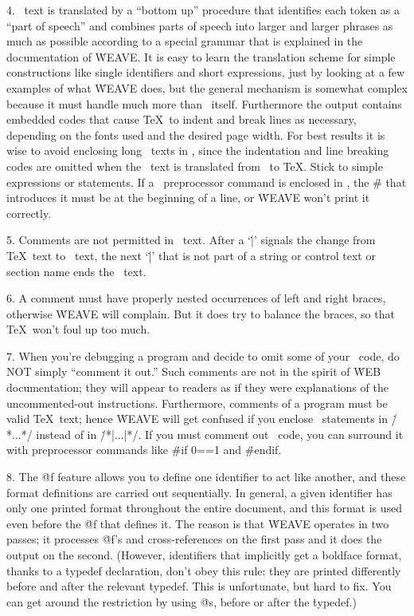 4. \Cee\ text is translated by a ``bottom up'' procedure that
identifies each token as a ``part of speech'' and combines parts of speech
into larger and larger phrases as much as possible according to a special
grammar that is explained in the documentation of \.{WEAVE}. It is easy to
learn the translation scheme for simple constructions like single
identifiers and short expressions, just by looking at a few examples of
what \.{WEAVE} does, but the general mechanism is somewhat complex because
it must handle much more than \Cee\ itself. Furthermore the output
contains embedded codes that cause \TeX\ to indent and break lines as
necessary, depending on the fonts used and the desired page width. For
best results it is wise to avoid enclosing long \Cee\ texts in \pb, since the
indentation and line breaking codes are omitted when the \pb\ text is
translated from \Cee\ to \TeX. Stick to simple expressions or
statements.  If a \Cee\ preprocessor command is enclosed in \pb,
the \.\# that introduces it must be at the beginning of a line,
or \.{WEAVE} won't print it correctly.

5. Comments are not permitted in \pb\ text. After a `\.|'
signals the change from \TeX\ text to \Cee\ text, the next `\.|' that is
not part of a string or control text or section name ends the \Cee\ text.

6. A comment must have properly nested occurrences of left and right
braces, otherwise \.{WEAVE} will complain. But it
does try to balance the braces, so that \TeX\ won't foul up too much.

7. When you're debugging a program and decide to omit some of your
\Cee\ code, do NOT simply ``comment it out.'' Such comments are not
in the spirit of \.{WEB} documentation; they will appear to readers
as if they were explanations of the uncommented-out instructions.
Furthermore, comments of a program must be valid \TeX\ text; hence
\.{WEAVE} will get confused if you enclose \Cee\ statements in
\.{/*...*/} instead of in \.{/*|...|*/}.  If you must comment out
\Cee\ code, you can surround it with preprocessor commands
like \.{\#if 0==1} and \.{\#endif}.

8. The \.{@f} feature allows you to define one identifier to act like
another, and these format definitions are carried out sequentially.
In general, a given identifier has only one printed format
throughout the entire document, and this format is used even before
the \.{@f} that defines it. The reason is that \.{WEAVE} operates in two
passes; it processes \.{@f}'s and cross-references on the first pass and
it does the output on the second.  (However, identifiers that
implicitly get a boldface format, thanks to a \.{typedef} declaration,
don't obey this rule: they are printed differently before and after
the relevant \.{typedef}.  This is unfortunate, but hard to fix. You can
get around the restriction by using \.{@s}, before or after the \.{typedef}.)

